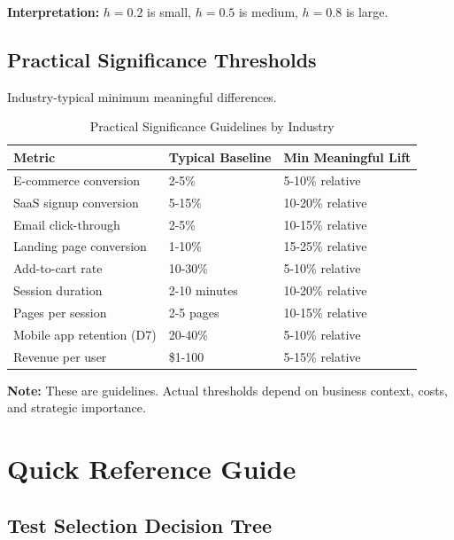 \textbf{Interpretation:} $h = 0.2$ is small, $h = 0.5$ is medium, $h = 0.8$ is large.

\subsection{Practical Significance Thresholds}

Industry-typical minimum meaningful differences.

\begin{table}[h]
\centering
\caption{Practical Significance Guidelines by Industry}
\begin{tabular}{p{4cm}p{5cm}p{4cm}}
\toprule
\textbf{Metric} & \textbf{Typical Baseline} & \textbf{Min Meaningful Lift} \\
\midrule
E-commerce conversion & 2-5\% & 5-10\% relative \\
SaaS signup conversion & 5-15\% & 10-20\% relative \\
Email click-through & 2-5\% & 10-15\% relative \\
Landing page conversion & 1-10\% & 15-25\% relative \\
Add-to-cart rate & 10-30\% & 5-10\% relative \\
Session duration & 2-10 minutes & 10-20\% relative \\
Pages per session & 2-5 pages & 10-15\% relative \\
Mobile app retention (D7) & 20-40\% & 5-10\% relative \\
Revenue per user & \$1-100 & 5-15\% relative \\
\bottomrule
\end{tabular}
\end{table}

\textbf{Note:} These are guidelines. Actual thresholds depend on business context, costs, and strategic importance.

\newpage

\section{Quick Reference Guide}

\subsection{Test Selection Decision Tree}

